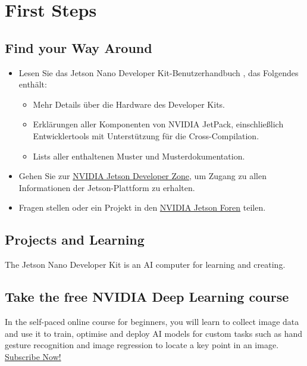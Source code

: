 %
%


\chapter{First Steps}

\section{Find your Way Around}

\begin{itemize}
    \item Lesen Sie das Jetson Nano Developer Kit-Benutzerhandbuch \cite{JetsonUserGuide:2019}, das Folgendes enthält: 
    \begin{itemize}
        \item Mehr Details über die Hardware des Developer Kits.
        \item Erklärungen aller Komponenten von NVIDIA JetPack, einschließlich Entwicklertools mit Unterstützung für die Cross-Compilation.
        \item Lists aller enthaltenen Muster und Musterdokumentation.
    \end{itemize}
    \item Gehen Sie zur \href{https://developer.nvidia.com/jetson}{NVIDIA Jetson Developer Zone}, um Zugang zu allen Informationen der Jetson-Plattform zu erhalten.
    \item Fragen stellen oder ein Projekt in den \href{https://devtalk.nvidia.com/default/board/372/jetson-projects/}{NVIDIA Jetson Foren} teilen. 
\end{itemize}


\section{Projects and Learning}

The Jetson Nano Developer Kit is an AI computer for learning and creating.

\section{Take the free NVIDIA Deep Learning course}

In the self-paced online course for beginners, you will learn to collect image data and use it to train, optimise and deploy AI models for custom tasks such as hand gesture recognition and image regression to locate a key point in an image. \href{https://courses.nvidia.com/courses/course-v1:DLI+C-RX-02+V1/about}{Subscribe Now!}


